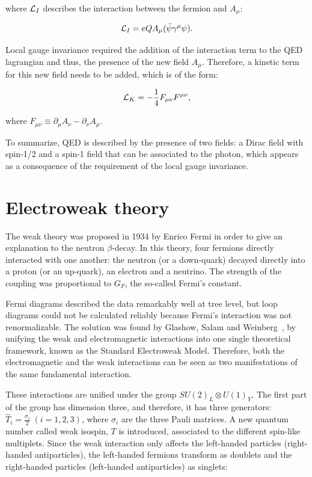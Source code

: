 \noindent where $\mathcal{L}_I$ describes the interaction between the fermion and $A_\mu$:

\begin{equation}
\lagrangian_{I} = eQA_\mu(\bar{\psi}\gamma^\mu \psi).
\label{eq:QEDLagrangianInteraction}
\end{equation}

Local gauge invariance required the addition of the interaction term to the QED lagrangian and thus, the presence of the new field $A_\mu$.
Therefore, a kinetic term for this new field needs to be added, which is of the form:

\begin{equation}
\mathcal{L}_{K} = -\frac{1}{4} F_{\mu\nu}F^{\mu\nu},
\label{eq:QEDLagrangianPhoton}
\end{equation}

\noindent where $F_{\mu\nu} \equiv \partial_\mu A_\nu - \partial_\nu A_\mu$.

To summarize, QED is described by the presence of two fields: a Dirac field with spin-1/2 and a spin-1 field that can be associated to the photon, which appears as a consequence of the requirement of the local gauge invariance.


\section{Electroweak theory}
    \label{sec:EWK}

The weak theory was proposed in 1934 by Enrico Fermi in order to give an explanation to the neutron $\beta$-decay.
In this theory, four fermions directly interacted with one another: the neutron (or a down-quark) decayed directly into a proton (or an up-quark), an electron and a neutrino.
The strength of the coupling was proportional to $G_F$, the so-called Fermi's constant.

Fermi diagrams described the data remarkably well at tree level, but loop diagrams could not be calculated reliably because Fermi's interaction was not renormalizable.
The solution was found by Glashow, Salam and Weinberg~\cite{Weinberg:1967tq}, by unifying the weak and electromagnetic interactions into one single theoretical framework, known as the Standard Electroweak Model.
Therefore, both the electromagnetic and the weak interactions can be seen as two manifestations of the same fundamental interaction.

These interactions are unified under the group $SU(2)_L \otimes U(1)_Y$.
The first part of the group has dimension three, and therefore, it has three generators: $\hat{T}_i = \frac{\sigma_i}{2}\;(i=1, 2, 3)$, where $\sigma_i$ are the three Pauli matrices.
A new quantum number called weak isospin, $T$ is introduced, associated to the different spin-like multiplets.
Since the weak interaction only affects the left-handed particles (right-handed antiparticles), the left-handed fermions transform as doublets and the right-handed particles (left-handed antiparticles) as singlets:

